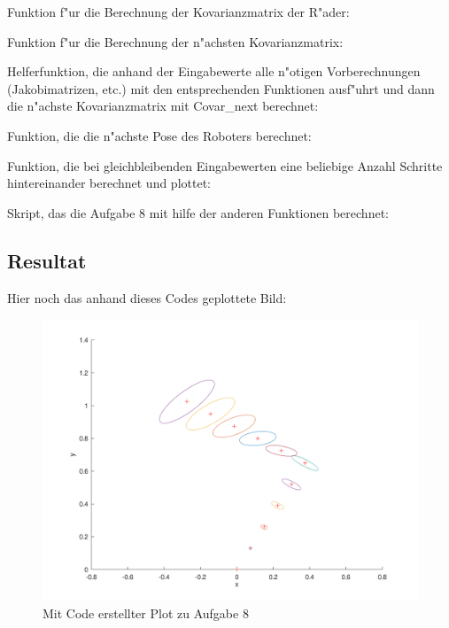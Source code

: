 \documentclass[11pt]{article}
\begin{document}
    
    Funktion f"ur die Berechnung der Kovarianzmatrix der R"ader:
    
    Funktion f"ur die Berechnung der n"achsten Kovarianzmatrix:
    
    Helferfunktion, die anhand der Eingabewerte alle n"otigen Vorberechnungen (Jakobimatrizen, etc.) mit den entsprechenden Funktionen ausf"uhrt und dann die n"achste Kovarianzmatrix mit Covar\_next berechnet:
    
    Funktion, die die n"achste Pose des Roboters berechnet:
    
    Funktion, die bei gleichbleibenden Eingabewerten eine beliebige Anzahl Schritte hintereinander berechnet und plottet:
    
    Skript, das die Aufgabe 8 mit hilfe der anderen Funktionen berechnet:
    
    \subsection{Resultat}\label{subsec:res}
    Hier noch das anhand dieses Codes geplottete Bild:
    \begin{figure}[H]
        \centering
        \includegraphics[width=15cm]{task8.png}
        \caption{Mit Code erstellter Plot zu Aufgabe 8}
        \label{fig:result}
    \end{figure}
\end{document}
